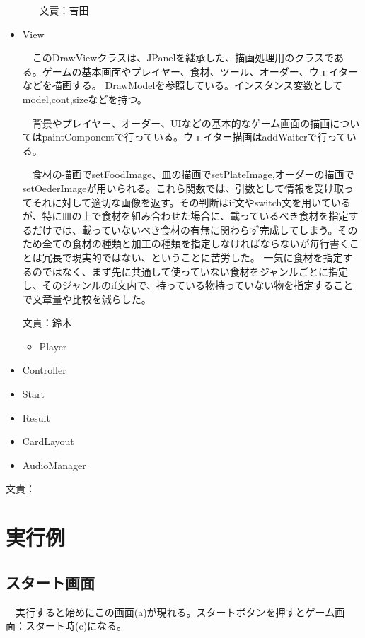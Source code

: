 \documentclass[a4j]{jsarticle} %
\begin{document}
\begin{itemize}
\begin{itemize}
    文責：吉田
  \end{itemize}   
  \item View\par
  　このDrawViewクラスは、JPanelを継承した、描画処理用のクラスである。ゲームの基本画面やプレイヤー、食材、ツール、オーダー、ウェイターなどを描画する。
  DrawModelを参照している。インスタンス変数としてmodel,cont,sizeなどを持つ。\par
  　背景やプレイヤー、オーダー、UIなどの基本的なゲーム画面の描画についてはpaintComponentで行っている。ウェイター描画はaddWaiterで行っている。\par
  　食材の描画でsetFoodImage、皿の描画でsetPlateImage,オーダーの描画でsetOederImageが用いられる。これら関数では、引数として情報を受け取ってそれに対して適切な画像を返す。その判断はif文やswitch文を用いているが、特に皿の上で食材を組み合わせた場合に、載っているべき食材を指定するだけでは、載っていないべき食材の有無に関わらず完成してしまう。そのため全ての食材の種類と加工の種類を指定しなければならないが毎行書くことは冗長で現実的ではない、ということに苦労した。
  一気に食材を指定するのではなく、まず先に共通して使っていない食材をジャンルごとに指定し、そのジャンルのif文内で、持っている物持っていない物を指定することで文章量や比較を減らした。\par
  文責：鈴木   
  \begin{itemize}
    \item Player\par
  \end{itemize}  
  \item Controller\par
  \item Start\par
  \item Result\par
  \item CardLayout\par
  \item AudioManager\par
\end{itemize}
文責：%



\section{実行例}
\subsection*{スタート画面}
　実行すると始めにこの画面(a)が現れる。スタートボタンを押すとゲーム画面：スタート時(c)になる。
\end{document}
